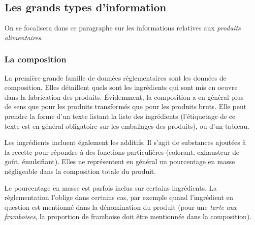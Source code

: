            \subsection{Les grands types d'information}
            \label{info_produit}

            On se focalisera dans ce paragraphe sur les informations relatives aux \emph{produits alimentaires}.

                \subsubsection{La composition}

                La première grande famille de données réglementaires sont les données de composition.
                Elles détaillent quels sont les ingrédients qui sont mis en oeuvre dans la fabrication des produits.
                \'{E}videmment, la composition a en général plus de sens que pour les produits transformés que pour les produits bruts.
                Elle peut prendre la forme d'un texte listant la liste des ingrédients (l'étiquetage de ce texte est en général obligatoire sur les emballages des produits), ou d'un tableau.
                
                Les ingrédients incluent également les additifs.
                Il s'agit de substances ajoutées à la recette pour répondre à des fonctions particulières (colorant, exhausteur de goût, émulsifiant).
                Elles ne représentent en général un pourcentage en masse négligeable dans la composition totale du produit.

                Le pourcentage en masse est parfois inclus sur certains ingrédients. 
                La règlementation l'oblige dans certains cas, par exemple quand l'ingrédient en question est mentionné dans la dénomination du produit (pour une \emph{tarte aux framboises}, la proportion de framboise doit être mentionnée dans la composition).


